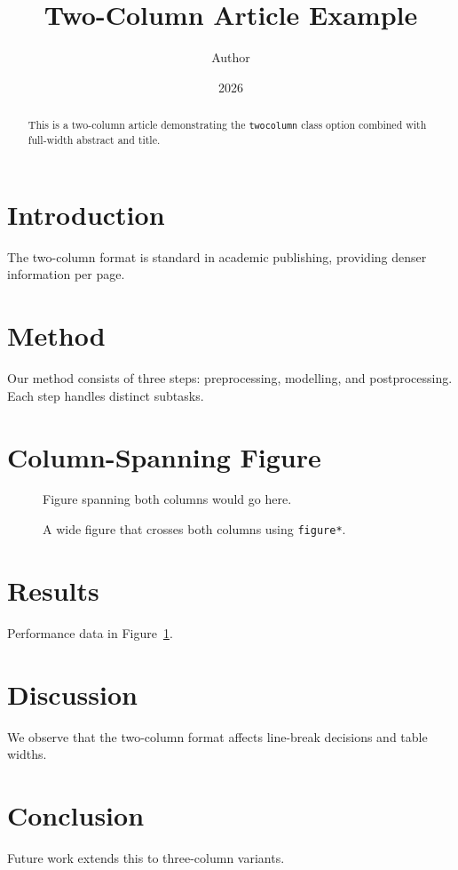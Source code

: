 \documentclass[twocolumn,10pt]{article}
\title{Two-Column Article Example}
\author{Author}
\date{2026}
\begin{document}
\maketitle

\begin{abstract}
This is a two-column article demonstrating the \texttt{twocolumn} class option combined with full-width abstract and title.
\end{abstract}

\section{Introduction}
The two-column format is standard in academic publishing, providing denser information per page.

\section{Method}
Our method consists of three steps: preprocessing, modelling, and postprocessing. Each step handles distinct subtasks.

\section{Column-Spanning Figure}

\begin{figure}[t]
\centering
Figure spanning both columns would go here.
\caption{A wide figure that crosses both columns using \texttt{figure*}.}
\label{fig:wide}
\end{figure}

\section{Results}
Performance data in Figure~\ref{fig:wide}.

\section{Discussion}
We observe that the two-column format affects line-break decisions and table widths.

\section{Conclusion}
Future work extends this to three-column variants.
\end{document}
